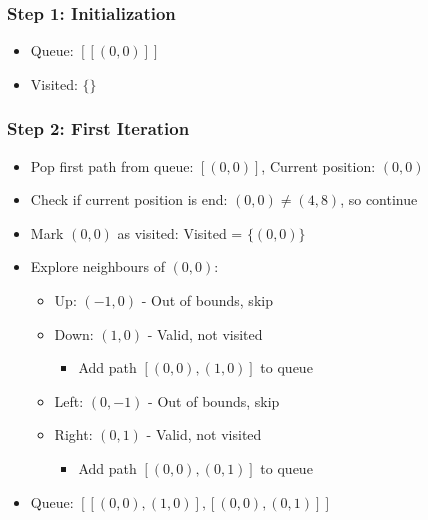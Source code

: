 \subsubsection{Step 1: Initialization}
\begin{itemize}
    \item Queue: $[[(0,0)]]$
    \item Visited: $\{\}$
\end{itemize}

\subsubsection{Step 2: First Iteration}
\begin{itemize}
    \item Pop first path from queue: $[(0,0)]$, Current position: $(0,0)$
    \item Check if current position is end: $(0,0) \neq (4,8)$, so continue
    \item Mark $(0,0)$ as visited: Visited = $\{(0,0)\}$
    \item Explore neighbours of $(0,0)$:
    \begin{itemize}
        \item Up: $(-1,0)$ - Out of bounds, skip
        \item Down: $(1,0)$ - Valid, not visited
        \begin{itemize}
            \item Add path $[(0,0), (1,0)]$ to queue
        \end{itemize}
        \item Left: $(0,-1)$ - Out of bounds, skip
        \item Right: $(0,1)$ - Valid, not visited
        \begin{itemize}
            \item Add path $[(0,0), (0,1)]$ to queue
        \end{itemize}
    \end{itemize}
    \item Queue: $[[(0,0), (1,0)], [(0,0), (0,1)]]$
\end{itemize}

